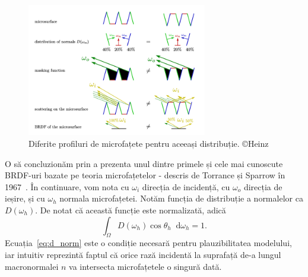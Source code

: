 \documentclass[12pt,a4paper]{report}
\newcommand*\diff{\mathop{}\!\mathrm{d}}
\numberwithin{equation}{section} %
\begin{document}
\begin{figure}[ht]
	\centering
	\includegraphics[width=0.7\textwidth]{pics/masking.png}
	\caption{Diferite profiluri de microfațete pentru aceeași distribuție. \copyright Heinz~\cite{HeitzMasking}}
	\label{fig:microfacet_profiles}
\end{figure}

O să concluzionăm prin a prezenta unul dintre primele și cele mai cunoscute BRDF-uri
bazate pe teoria microfațetelor - descris de Torrance și Sparrow în 1967~\cite{TorranceOld}.
În continuare, vom nota cu $\omega_i$ direcția de incidență, cu $\omega_o$ direcția de ieșire,
și cu $\omega_h$ normala microfațetei. Notăm funcția de distribuție a normalelor ca
$D(\omega_h)$. De notat că această funcție este normalizată, adică
\begin{equation}\label{eq:d_norm}
	\int_{\Omega} D(\omega_h)\cos \theta_h \diff \omega_h = 1.
\end{equation}
Ecuația~\ref{eq:d_norm} este o condiție necesară pentru plauzibilitatea modelului, iar
intuitiv reprezintă faptul că orice rază incidentă la suprafață de-a lungul macronormalei $n$ va
intersecta microfațetele o singură dată.
\end{document}
